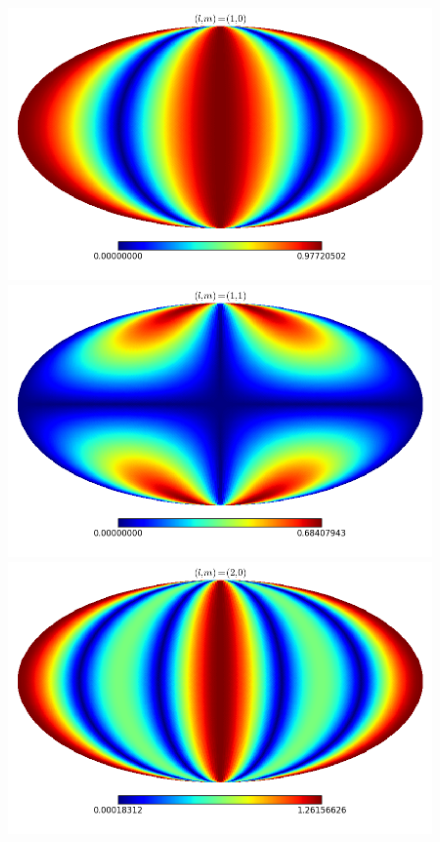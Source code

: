 \begin{figure}
\begin{center}
\includegraphics[scale=0.3]{Fourier/(1,0).png}
\includegraphics[scale=0.3]{Fourier/(1,1).png}
\includegraphics[scale=0.3]{Fourier/(2,0).png}

\end{center}
\end{figure}
